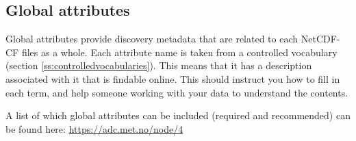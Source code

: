 \documentclass[a4paper,english, 11pt]{article}
\begin{document}
\subsection{Global attributes}
\label{ss:globalattributes}

Global attributes provide discovery metadata that are related to each NetCDF-CF files as a whole. Each attribute name is taken from a controlled vocabulary (section \ref{ss:controlledvocabularies}). This means that it has a description associated with it that is findable online. This should instruct you how to fill in each term, and help someone working with your data to understand the contents.

A list of which global attributes can be included (required and recommended) can be found here:
\href{https://adc.met.no/node/4}{https://adc.met.no/node/4}
\end{document}
